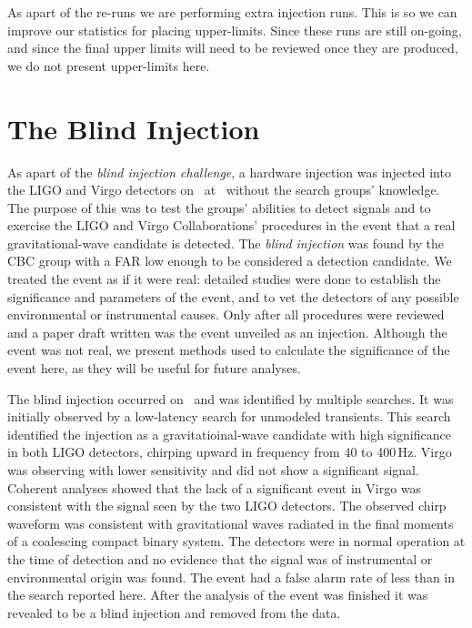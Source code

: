 As apart of the re-runs we are performing extra injection runs. This is so we can improve our statistics for placing upper-limits. Since these runs are still on-going, and since the final upper limits will need to be reviewed once they are produced, we do not present upper-limits here.


\section{The Blind Injection}

As apart of the {\it blind injection challenge}, a hardware injection was
injected into the \ac{LIGO} and Virgo detectors on \dogDate~at
\injectedDogTime~without the search groups' knowledge. The purpose of this was
to test the groups' abilities to detect signals and to exercise the LIGO and
Virgo Collaborations' procedures in the event that a real gravitational-wave
candidate is detected. The {\it blind injection} was found by the \ac{CBC}
group with a FAR low enough to be considered a detection candidate. We treated
the event as if it were real: detailed studies were done to establish the
significance and parameters of the event, and to vet the detectors of any
possible environmental or instrumental causes. Only after all procedures were
reviewed and a paper draft written was the event unveiled as an injection.
Although the event was not real, we present methods used to calculate the
significance of the event here, as they will be useful for future analyses.

The blind injection occurred on \dogDate~and was identified by multiple
searches. It was initially observed by a low-latency search for unmodeled
transients.  This search identified the injection as a gravitatioinal-wave
candidate with high significance in both LIGO detectors, chirping upward in
frequency from 40 to 400\,Hz. Virgo was observing with lower sensitivity and
did not show a significant signal. Coherent analyses showed that the lack of a
significant event in Virgo was consistent with the signal seen by the two LIGO
detectors. The observed chirp waveform was consistent with gravitational waves
radiated in the final moments of a coalescing compact binary system. The
detectors were in normal operation at the time of detection and no evidence
that the signal was of instrumental or environmental origin was found. The
event had a false alarm rate of less than \dogFAR in the search
reported here. After the analysis of the event was finished it was revealed 
to be a blind injection and removed from the data. 

